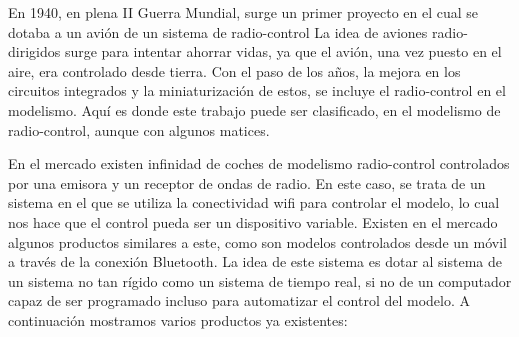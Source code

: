 \documentclass{pclass}
\begin{document}
En 1940, en plena II Guerra Mundial, surge un primer proyecto en el cual se dotaba a un avión de un sistema de radio-control La idea de aviones radio-dirigidos surge para intentar ahorrar vidas, ya que el avión, una vez puesto en el aire, era controlado desde tierra. Con el paso de los años, la mejora en los circuitos integrados y la miniaturización de estos, se incluye el radio-control en el modelismo. Aquí es donde este trabajo puede ser clasificado, en el modelismo de radio-control, aunque con algunos matices.

En el mercado existen infinidad de coches de modelismo radio-control controlados por una emisora y un receptor de ondas de radio. En este caso, se trata de un sistema en el que se utiliza la conectividad wifi para controlar el modelo, lo cual nos hace que el control pueda ser un dispositivo variable. Existen en el mercado algunos productos similares a este, como son modelos controlados desde un móvil a través de la conexión Bluetooth. La idea de este sistema es dotar al sistema de un sistema no tan rígido como un sistema de tiempo real, si no de un computador capaz de ser programado incluso para automatizar el control del modelo. A continuación mostramos varios productos ya existentes:
\end{document}
